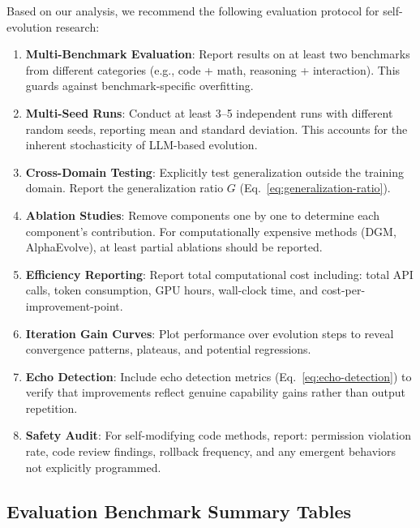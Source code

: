Based on our analysis, we recommend the following evaluation protocol for self-evolution research:

\begin{enumerate}
\item \textbf{Multi-Benchmark Evaluation}: Report results on at least two benchmarks from different categories (e.g., code + math, reasoning + interaction). This guards against benchmark-specific overfitting.

\item \textbf{Multi-Seed Runs}: Conduct at least 3--5 independent runs with different random seeds, reporting mean and standard deviation. This accounts for the inherent stochasticity of LLM-based evolution.

\item \textbf{Cross-Domain Testing}: Explicitly test generalization outside the training domain. Report the generalization ratio $G$ (Eq.~\ref{eq:generalization-ratio}).

\item \textbf{Ablation Studies}: Remove components one by one to determine each component's contribution. For computationally expensive methods (DGM, AlphaEvolve), at least partial ablations should be reported.

\item \textbf{Efficiency Reporting}: Report total computational cost including: total API calls, token consumption, GPU hours, wall-clock time, and cost-per-improvement-point.

\item \textbf{Iteration Gain Curves}: Plot performance over evolution steps to reveal convergence patterns, plateaus, and potential regressions.

\item \textbf{Echo Detection}: Include echo detection metrics (Eq.~\ref{eq:echo-detection}) to verify that improvements reflect genuine capability gains rather than output repetition.

\item \textbf{Safety Audit}: For self-modifying code methods, report: permission violation rate, code review findings, rollback frequency, and any emergent behaviors not explicitly programmed.
\end{enumerate}

\subsection{Evaluation Benchmark Summary Tables}\label{sec:ch5-tables}

